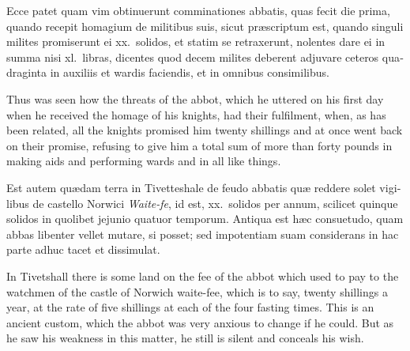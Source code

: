 \documentclass[10pt]{book}
\begin{document}
\begin{paracol}{2}
\switchcolumn*

\begin{otherlanguage}{latin}
Ecce patet quam vim obtinuerunt comminationes abbatis, quas fecit die prima, quando recepit homagium de militibus suis, sicut pr\ae{}scriptum est, quando singuli milites promiserunt ei xx.\ solidos, et statim se retraxerunt, nolentes dare ei in summa nisi xl.\ libras, dicentes quod decem milites deberent adjuvare ceteros quadraginta in auxiliis et wardis faciendis, et in omnibus consimilibus.
\end{otherlanguage}

\switchcolumn

Thus was seen how the threats of the abbot, which he uttered on his first day when he received the homage of his knights, had their fulfilment, when, as has been related, all the knights promised him twenty shillings and at once went back on their promise, refusing to give him a total sum of more than forty pounds in making aids and performing wards and in all like things.

\switchcolumn*

\begin{otherlanguage}{latin}
Est autem qu\ae{}dam terra in Tivetteshale de feudo abbatis qu\ae{} reddere solet vigilibus de castello Norwici \emph{Waite-fe}, id est, xx.\ solidos per annum, scilicet quinque solidos in quolibet jejunio quatuor temporum. Antiqua est h\ae{}c consuetudo, quam abbas libenter vellet mutare, si posset; sed impotentiam suam considerans in hac parte adhuc tacet et dissimulat.
\end{otherlanguage}

\switchcolumn

In Tivetshall there is some land on the fee of the abbot which used to pay to the watchmen of the castle of Norwich waite-fee, which is to say, twenty shillings a year, at the rate of five shillings at each of the four fasting times. This is an ancient custom, which the abbot was very anxious to change if he could. But as he saw his weakness in this matter, he still is silent and conceals his wish.

\switchcolumn*


\end{paracol}
\end{document}
